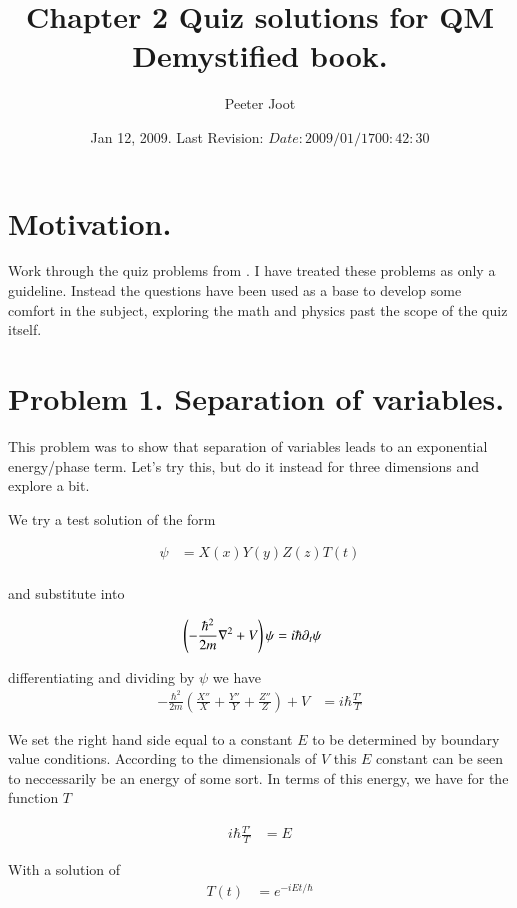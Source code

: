 \documentclass{article}
\title{ Chapter 2 Quiz solutions for QM Demystified book. }
\author{Peeter Joot}
\date{ Jan 12, 2009.  Last Revision: $Date: 2009/01/17 00:42:30 $ }
\begin{document}
\maketitle{}
\tableofcontents
\section{ Motivation. }

Work through the quiz problems from \cite{mcmahon2005qmd}.  I have treated these problems as only a guideline.  Instead the questions have been used as a
base to develop some comfort in the subject, exploring the math and physics past the scope of the quiz itself.

\section{ Problem 1. Separation of variables. }

This problem was to show that separation of variables leads to an exponential energy/phase
term.  Let's try this, but do it instead for three dimensions and explore a bit.

We try a test solution of the form

\begin{align*}
\psi &= X(x) Y(y) Z(z) T(t) \\
\end{align*}

and substitute into 

\begin{align*}
\left(-\frac{\hbar^2}{2m}\nabla^2 + V\right) \psi &= i \hbar \partial_t \psi
\end{align*}

differentiating and dividing by $\psi$ we have
\begin{align*}
-\frac{\hbar^2}{2m}
\left(
\frac{X''}{X}
+\frac{Y''}{Y}
+\frac{Z''}{Z}
\right)
 + V &= i \hbar \frac{T'}{T}
\end{align*}

We set the right hand side equal to a constant $E$ to be determined by boundary value conditions.
According to the dimensionals of $V$ this $E$ constant can be seen to neccessarily be an energy
of some sort.  In terms of this energy, we have for the function $T$

\begin{align*}
i \hbar \frac{T'}{T} &= E
\end{align*}

With a solution of
\begin{align*}
T(t) &= e^{-i E t/\hbar}
\end{align*}
\end{document}
